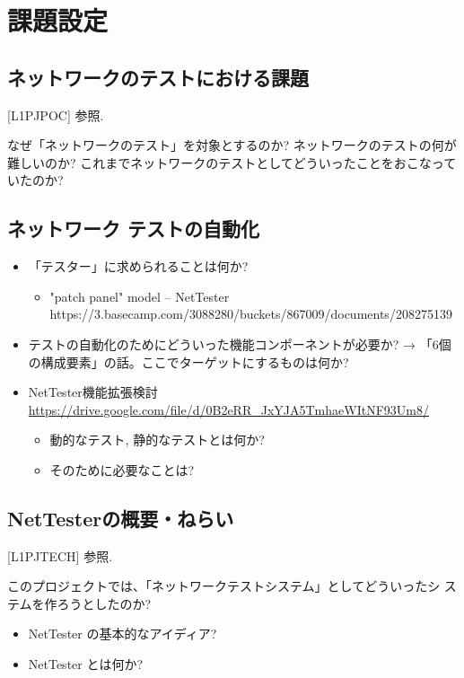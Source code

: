 
\chapter{課題設定}

 \section{ネットワークのテストにおける課題}

[L1PJPOC] 参照.

なぜ「ネットワークのテスト」を対象とするのか?
ネットワークのテストの何が難しいのか?
これまでネットワークのテストとしてどういったことをおこなっていたのか?

\section{ネットワーク テストの自動化}

\begin{itemize}
 \item 「テスター」に求められることは何か?
       \begin{itemize}
        \item "patch panel" model – NetTester https://3.basecamp.com/3088280/buckets/867009/documents/208275139
       \end{itemize}
 \item テストの自動化のためにどういった機能コンポーネントが必要か?
       → 「6個の構成要素」の話。ここでターゲットにするものは何か?
 \item NetTester機能拡張検討 \url{https://drive.google.com/file/d/0B2eRR_JxYJA5TmhaeWItNF93Um8/}
       \begin{itemize}
        \item 動的なテスト, 静的なテストとは何か?
        \item そのために必要なことは?
       \end{itemize}
\end{itemize}

\section{NetTesterの概要・ねらい}

[L1PJTECH] 参照.

このプロジェクトでは、「ネットワークテストシステム」としてどういったシ
ステムを作ろうとしたのか?

\begin{itemize}
 \item NetTester の基本的なアイディア?
 \item NetTester とは何か?
\end{itemize}

